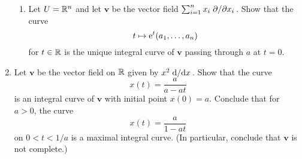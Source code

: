 \documentclass[../psets.tex]{subfiles}
\begin{document}
\begin{enumerate}[label={\textbf{2.2.\roman*.}}]
\begin{enumerate}
        \item Let $U=\R^n$ and let $\bm{v}$ be the vector field $\sum_{i=1}^nx_i\pdv*{x_i}$. Show that the curve
        \begin{equation*}
            t \mapsto \e[t](a_1,\dots,a_n)
        \end{equation*}
        for $t\in\R$ is the unique integral curve of $\bm{v}$ passing through $a$ at $t=0$.
    \end{enumerate}
    \setcounter{enumi}{7}
    \item Let $\bm{v}$ be the vector field on $\R$ given by $x^2\dv*{x}$. Show that the curve
    \begin{equation*}
        x(t) = \frac{a}{a-at}
    \end{equation*}
    is an integral curve of $\bm{v}$ with initial point $x(0)=a$. Conclude that for $a>0$, the curve
    \begin{equation*}
        x(t) = \frac{a}{1-at}
    \end{equation*}
    on $0<t<1/a$ is a maximal integral curve. (In particular, conclude that $\bm{v}$ is not complete.)
\end{enumerate}
\end{document}

